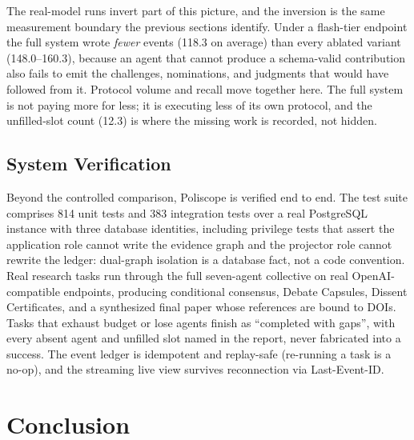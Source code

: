 The real-model runs invert part of this picture, and the inversion is the
same measurement boundary the previous sections identify. Under a flash-tier
endpoint the full system wrote \emph{fewer} events (118.3 on average) than
every ablated variant (148.0--160.3), because an agent that cannot produce a
schema-valid contribution also fails to emit the challenges, nominations,
and judgments that would have followed from it. Protocol volume and recall
move together here. The full system is not paying more for less; it is
executing less of its own protocol, and the unfilled-slot count (12.3) is
where the missing work is recorded, not hidden.

\subsection{System Verification}

Beyond the controlled comparison, Poliscope is verified end to end. The test
suite comprises 814 unit tests and 383 integration tests over a real
PostgreSQL instance with three database identities, including privilege tests
that assert the application role cannot write the evidence graph and the
projector role cannot rewrite the ledger: dual-graph isolation is a database
fact, not a code convention. Real research tasks run through the full
seven-agent collective on real OpenAI-compatible endpoints, producing
conditional consensus, Debate Capsules, Dissent Certificates, and a
synthesized final paper whose references are bound to DOIs. Tasks that exhaust
budget or lose agents finish as ``completed with gaps'', with every absent
agent and unfilled slot named in the report, never fabricated into a success.
The event
ledger is idempotent and replay-safe (re-running a task is a no-op), and the
streaming live view survives reconnection via Last-Event-ID.

\section{Conclusion}

